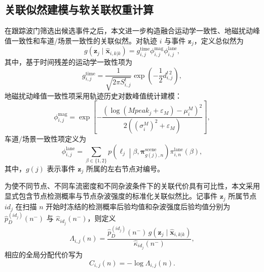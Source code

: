 \documentclass{xdupgthesis}
\begin{document}
\subsection{关联似然建模与软关联权重计算}

在跟踪波门筛选出候选事件之后，本文进一步构造融合运动学一致性、地磁扰动峰值一致性和车道/场景一致性的关联似然。对轨迹 $i$ 与事件 $\mathbf z_j$，定义总似然为
\begin{equation}
	g(\mathbf z_j\mid \hat{\mathbf x}_{i,k|k})
	=
	g_{i,j}^{\mathrm{time}}
	\phi_{i,j}^{\mathrm{mag}}
	\phi_{i,j}^{\mathrm{lane}},
	\label{eq:ch3_total_likelihood}
\end{equation}
其中，基于时间残差的运动学一致性项为
\begin{equation}
	g_{i,j}^{\mathrm{time}}
	=
	\frac{1}{\sqrt{2\pi S^{t}_{i,j}}}
	\exp\left(-\frac{1}{2}d^{t\,2}_{i,j}\right),
	\label{eq:ch3_g_time}
\end{equation}
地磁扰动峰值一致性项采用轨迹历史对数峰值统计建模：
\begin{equation}
	\phi_{i,j}^{\mathrm{mag}}
	=
	\exp\left[
	-\frac{
		\left(
		\log(Mpeak_j+\varepsilon_M)-\mu_i^{M}
		\right)^2
	}{2\left((\sigma_i^{M})^2+\varepsilon_M\right)}
	\right],
	\label{eq:ch3_phi_mag}
\end{equation}
车道/场景一致性项定义为
\begin{equation}
	\phi_{i,j}^{\mathrm{lane}}
	=
	\sum_{\beta\in\{1,2\}}
	p\!\left(\ell_j\middle|\beta,\boldsymbol\pi_{g(j),n}^{\mathrm{scene}}\right)
	\pi_{i,n}^{\mathrm{lane}}(\beta),
	\label{eq:ch3_phi_lane}
\end{equation}
其中，$g(j)$ 表示事件 $\mathbf z_j$ 所属的左右节点对编号。

为使不同节点、不同车流密度和不同杂波条件下的关联代价具有可比性，本文采用显式包含节点检测概率与节点杂波强度的标准化关联似然比。记事件 $\mathbf z_j$ 所属节点 $id_j$ 在扫描 $n$ 开始时冻结的检测概率后验均值和杂波强度后验均值分别为 $\hat p_D^{(id_j)}(n^-)$ 与 $\hat\kappa_{id_j}(n^-)$，则定义
\begin{equation}
	\Lambda_{i,j}(n)
	=
	\frac{\hat p_D^{(id_j)}(n^-)\,g(\mathbf z_j\mid \hat{\mathbf x}_{i,k|k})}{\hat\kappa_{id_j}(n^-)},
	\label{eq:ch3_assoc_ratio}
\end{equation}
相应的全局分配代价写为
\begin{equation}
	C_{i,j}(n)=-\log \Lambda_{i,j}(n).
	\label{eq:ch3_assoc_cost}
\end{equation}
\end{document}

